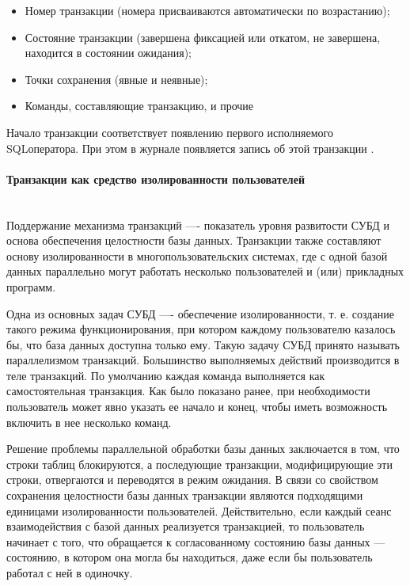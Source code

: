 \begin{itemize}
    \item Номер транзакции (номера присваиваются автоматически по возрастанию);
    \item Состояние транзакции (завершена фиксацией или откатом, не завершена, находится в состоянии ожидания);
    \item Точки сохранения (явные и неявные);
    \item Команды, составляющие транзакцию, и прочие
\end{itemize}

Начало транзакции соответствует появлению первого исполняемого SQLоператора. При этом в журнале появляется запись об этой транзакции \autocite{Karpova2009}.

\paragraph{Транзакции как средство изолированности пользователей} ~\\

Поддержание механизма транзакций —- показатель уровня развитости СУБД и основа обеспечения целостности базы данных. Транзакции также составляют основу изолированности в многопользовательских системах, где с одной базой данных параллельно могут работать несколько пользователей и (или) прикладных программ. 


Одна из основных задач СУБД —- обеспечение изолированности, т. е. создание такого режима функционирования, при котором каждому пользователю казалось бы, что база данных доступна только ему. Такую задачу СУБД принято называть параллелизмом транзакций. Большинство выполняемых действий производится в теле транзакций. По умолчанию каждая команда выполняется как самостоятельная транзакция. Как было показано ранее, при необходимости пользователь может явно указать ее начало и конец, чтобы иметь возможность включить в нее несколько команд.


Решение проблемы параллельной обработки базы данных заключается в том, что строки таблиц блокируются, а последующие транзакции, модифицирующие эти строки, отвергаются и переводятся в режим ожидания. В связи со свойством сохранения целостности базы данных транзакции являются подходящими единицами изолированности пользователей. Действительно, если каждый сеанс взаимодействия с базой данных реализуется транзакцией, то пользователь начинает с того, что обращается к согласованному состоянию базы данных — состоянию, в котором она могла бы находиться, даже если бы пользователь работал с ней в одиночку.


